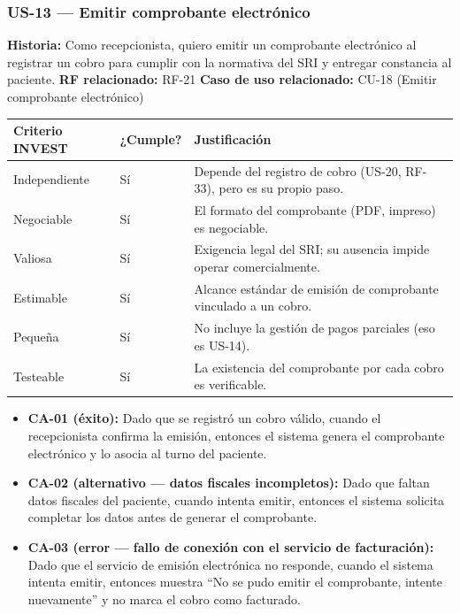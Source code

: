 \documentclass[11pt,a4paper]{article}
\providecommand{\tightlist}{%
	\setlength{\itemsep}{0pt}\setlength{\parskip}{0pt}}
\begin{document}
	\subsubsection{US-13 --- Emitir comprobante electrónico}
	
	\textbf{Historia:} Como recepcionista, quiero emitir un comprobante electrónico al registrar un cobro para cumplir con la normativa del SRI y entregar constancia al paciente.
	\textbf{RF relacionado:} RF-21
	\textbf{Caso de uso relacionado:} CU-18 (Emitir comprobante electrónico)
	
	\begin{longtable}{p{} p{} p{}}
		
		
		\toprule
		\textbf{Criterio INVEST} &
		\textbf{¿Cumple?} &
		\textbf{Justificación} \\
		\midrule
		\endhead
		
		Independiente & Sí & Depende del registro de cobro (US-20, RF-33), pero es su propio paso. \\
		Negociable & Sí & El formato del comprobante (PDF, impreso) es negociable. \\
		Valiosa & Sí & Exigencia legal del SRI; su ausencia impide operar comercialmente. \\
		Estimable & Sí & Alcance estándar de emisión de comprobante vinculado a un cobro. \\
		Pequeña & Sí & No incluye la gestión de pagos parciales (eso es US-14). \\
		Testeable & Sí & La existencia del comprobante por cada cobro es verificable. \\
		
		\bottomrule
	\end{longtable}
	
	\begin{itemize}
		\tightlist
		\item
		\textbf{CA-01 (éxito):} Dado que se registró un cobro válido, cuando el recepcionista confirma la emisión, entonces el sistema genera el comprobante electrónico y lo asocia al turno del paciente.
		\item
		\textbf{CA-02 (alternativo --- datos fiscales incompletos):} Dado que faltan datos fiscales del paciente, cuando intenta emitir, entonces el sistema solicita completar los datos antes de generar el comprobante.
		\item
		\textbf{CA-03 (error --- fallo de conexión con el servicio de facturación):} Dado que el servicio de emisión electrónica no responde, cuando el sistema intenta emitir, entonces muestra ``No se pudo emitir el comprobante, intente nuevamente'' y no marca el cobro como facturado.
	\end{itemize}
	
\end{document}
